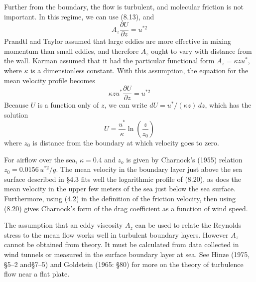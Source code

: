 \begin{table}[h!]
{{\begin{minipage}{11.5cm}
\hspace*{1 em}Further from the boundary, the flow is turbulent, and
molecular friction is not important. In this regime, we can use (8.13), and
\begin{equation}
A_z \frac{\partial U}{\partial z} = u^{*2}
\end{equation}
\hspace*{1 em}Prandtl and Taylor assumed that large eddies are more
effective in mixing momentum than small
eddies, and therefore $A_z$ ought to vary with distance from the
wall. Karman assumed that it had the particular functional form $A_z =
\kappa z u^*$, where $\kappa$ is a dimensionless constant. With this
assumption, the equation for the mean velocity profile becomes
\begin{equation}
\kappa z u^* \frac{\partial U}{\partial z} = u^{*2}
\end{equation}
\hspace*{1 em}Because $U$ is a function only of $z$, we can write
$dU = u^*/(\kappa z) \, dz$, which has the solution
\begin{equation}
U = \frac{u^*}{\kappa} \ln \left(\frac{z}{z_0}\right)
\end{equation}
where $z_0$ is distance from the boundary at which velocity goes to
zero.

\hspace*{1 em}For airflow over the sea, $\kappa = 0.4$ and $z_o$ is
given by Charnock's (1955) relation $z_0 = 0.0156 \, u^{*2}/g$. The
mean velocity in the boundary layer just above the sea surface
described in \S 4.3 fits well the logarithmic profile of (8.20), as
does the mean velocity in the upper few meters of the sea just below
the sea surface. Furthermore, using (4.2) in the definition of the
friction velocity, then using
(8.20) gives Charnock's form of the drag
coefficient as a function of wind
speed.\rule[-1ex]{0mm}{1ex}
\vspace{0.5ex}
\end{minipage}
}}
\vspace{-3ex}
\end{table}

The assumption that an eddy viscosity $A_z$ can be used to relate the
Reynolds stress to the mean flow works well in turbulent boundary
layers. However $A_z$ cannot be obtained from theory. It must be
calculated from data collected in wind tunnels or measured in the
surface boundary layer at sea. See Hinze (1975, \S5--2 and\S7--5) and
Goldstein (1965: \S80) for more on the theory of
turbulence flow near a flat plate.


